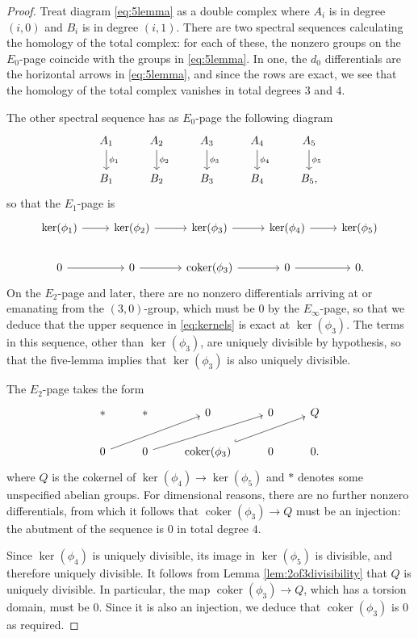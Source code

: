 \documentclass[11pt, oneside, dvipsnames, svgnames, table, final]{amsart}
\theoremstyle{plain}
\theoremstyle{definition}
\theoremstyle{remark}
\newcommand{\coker}{\operatorname{coker}}
\newcommand{\<}[1]{{\langle}#1 {\rangle}}
\begin{document}
\begin{proof}
  Treat diagram \eqref{eq:5lemma} as a double complex where $A_i$ is in degree $(i,0)$ and $B_i$ is in degree $(i,1)$. There are two spectral sequences calculating the homology of the total complex: for each of these, the nonzero groups on the $E_0$-page coincide with the groups in \eqref{eq:5lemma}. In one, the $d_0$ differentials are the horizontal arrows in \eqref{eq:5lemma}, and since the rows are exact, we see that the homology of the total complex vanishes in total degrees $3$ and $4$.

  The other spectral sequence has as $E_0$-page the following diagram
   \begin{equation*}
    \begin{tikzcd}
      A_1 \dar{\phi_1}  & A_2 \dar{\phi_2}  & A_3 \dar{\phi_3}  & A_4 \dar{\phi_4}  & A_5 \dar{\phi_5} \\
      B_1  & B_2  & B_3  & B_4 &  B_5,
    \end{tikzcd}
  \end{equation*}
  so that the $E_1$-page is
  \begin{equation}
    \begin{tikzcd}\label{eq:kernels}
      \ker(\phi_1) \rar & \ker(\phi_2) \rar & \ker(\phi_3) \rar & \ker(\phi_4) \rar & \ker(\phi_5) \\
      0 \rar & 0 \rar & \coker(\phi_3) \rar & 0 \rar  & 0.
    \end{tikzcd}
  \end{equation}
  On the $E_2$-page and later, there are no nonzero differentials arriving at or emanating from the $(3,0)$-group, which must be $0$ by the $E_\infty$-page, so that we deduce that the upper sequence in \eqref{eq:kernels} is exact at $\ker(\phi_3)$. The terms in this sequence, other than $\ker(\phi_3)$, are uniquely divisible by hypothesis, so that the five-lemma implies that $\ker(\phi_3)$ is also uniquely divisible.

  The $E_2$-page takes the form
  \[
  \begin{tikzcd}\label{eq:E2}
     \ast  & \ast   & 0  & 0  & Q \\
      0 \arrow[urr] & 0 \arrow[urr] & \coker(\phi_3) \arrow[urr, hook]  & 0   & 0.
    \end{tikzcd} 
  \]
  where $Q$ is the cokernel of $\ker(\phi_4) \to \ker(\phi_5)$ and $\ast$ denotes some unspecified abelian groups. For dimensional reasons, there are no further nonzero differentials, from which it follows that $\coker(\phi_3) \to Q$ must be an injection: the abutment of the sequence is $0$ in total degree $4$.

  Since $\ker(\phi_4)$ is uniquely divisible, its image in $\ker(\phi_5)$ is divisible, and therefore uniquely divisible. It follows from Lemma \ref{lem:2of3divisibility} that $Q$ is uniquely divisible. In particular, the map $\coker(\phi_3) \to Q$, which has a torsion domain, must be $0$. Since it is also an injection, we deduce that $\coker(\phi_3)$ is $0$ as required.
\end{proof}



\printbibliography
\end{document}
